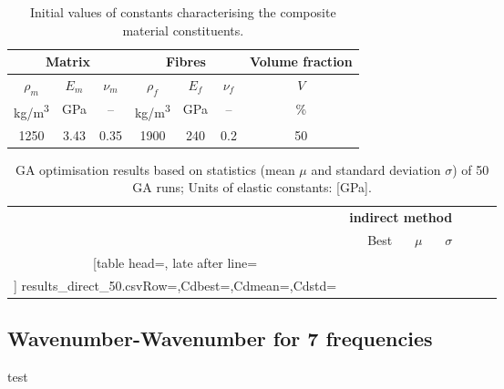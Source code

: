 \documentclass[runningheads]{llncs}
\begin{document}
 \begin{table}[h]
	\renewcommand{\arraystretch}{1.3}
	\centering \footnotesize
	\caption{Initial values of constants characterising the composite material constituents.}
	\begin{tabular}{ccccccc} 
		\toprule
		\multicolumn{3}{c}{\textbf{Matrix} }	& \multicolumn{3}{c}{\textbf{Fibres} } & \textbf{Volume fraction}	 \\ 
		\midrule
		$\rho_m$ & $E_m$ & $\nu_m$  & $\rho_f$ & $E_f$ & $\nu_f$ & $V$\\
		kg/m\textsuperscript{3} &GPa& --  & kg/m\textsuperscript{3}  & GPa& -- & \%\\ 
		\cmidrule(lr){1-3} \cmidrule(lr){4-6} \cmidrule(lr){7-7}
		1250 &3.43& 0.35& 1900 & 240 & 0.2 & 50\\
		\bottomrule 
	\end{tabular} 
	\label{tab:matprop}
\end{table}


\begin{table}[h]
	\renewcommand{\arraystretch}{1.3}
	\centering \footnotesize
	\caption{GA optimisation results based on statistics (mean $\mu$ and standard deviation $\sigma$) of 50 GA runs; Units of  elastic constants: [GPa].}	
	\begin{tabular}{crrrrrr} \toprule
		&\multicolumn{3}{c}{\textbf{indirect method}} \\
		\cmidrule(lr){2-4} 
		&Best & $\mu$ & $\sigma$ \\
		\cmidrule(lr){2-4} 
		\csvreader[table head=\toprule ,
		late after line=\\ ]%
		{results_direct_50.csv}{Row=\constants,Cdbest=\cdbest,Cdmean=\cdmean,Cdstd=\cdstd}%
		{\constants & \cdbest & \cdmean & \cdstd}%
		\bottomrule
	\end{tabular}	
	\label{tab:csv_results}
\end{table}

\subsection{Wavenumber-Wavenumber for 7 frequencies}

test
\end{document}
